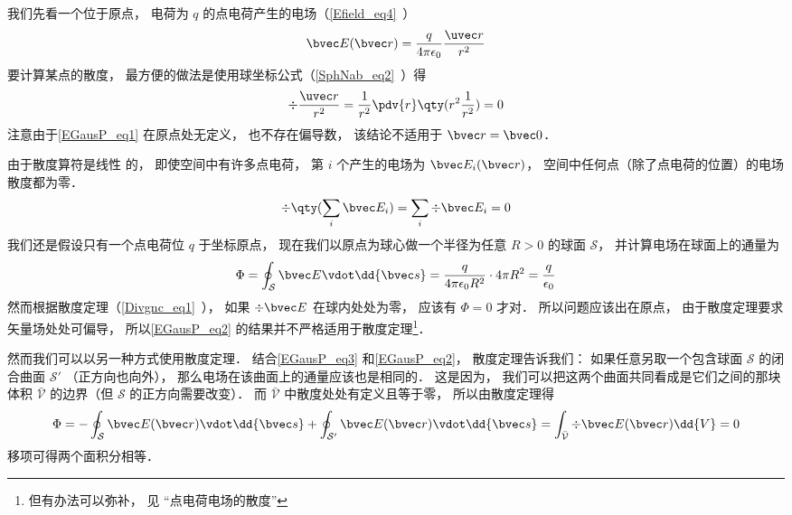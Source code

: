 




我们先看一个位于原点， 电荷为 $q$ 的点电荷产生的电场（\autoref{Efield_eq4}~）
\begin{equation}\label{EGausP_eq1}
\bvec E(\bvec r) = \frac{q}{4\pi\epsilon_0}\frac{\uvec r}{r^2}
\end{equation}
要计算某点的散度， 最方便的做法是使用球坐标公式（\autoref{SphNab_eq2}~）得
\begin{equation}
\div \frac{\uvec r}{r^2} = \frac{1}{r^2} \pdv{r} \qty(r^2 \frac{1}{r^2}) = 0
\end{equation}
注意由于\autoref{EGausP_eq1} 在原点处无定义， 也不存在偏导数， 该结论不适用于 $\bvec r = \bvec 0$．

由于散度算符是线性%
的， 即使空间中有许多点电荷， 第 $i$ 个产生的电场为 $\bvec E_i(\bvec r)$， 空间中任何点（除了点电荷的位置）的电场散度都为零．
\begin{equation}\label{EGausP_eq3}
\div \qty(\sum_i \bvec E_i) = \sum_i \div \bvec E_i = 0
\end{equation}
我们还是假设只有一个点电荷位 $q$ 于坐标原点， 现在我们以原点为球心做一个半径为任意 $R > 0$ 的球面 $\mathcal S$， 并计算电场在球面上的通量为
\begin{equation}\label{EGausP_eq2}
\Phi = \oint_{\mathcal S} \bvec E \vdot \dd{\bvec s} = \frac{q}{4\pi\epsilon_0 R^2} \cdot 4\pi R^2 = \frac{q}{\epsilon_0}
\end{equation}
然而根据散度定理（\autoref{Divgnc_eq1}~）， 如果 $\div \bvec E$ 在球内处处为零， 应该有 $\Phi = 0$ 才对． 所以问题应该出在原点， 由于散度定理要求矢量场处处可偏导， 所以\autoref{EGausP_eq2} 的结果并不严格适用于散度定理\footnote{但有办法可以弥补， 见 “点电荷电场的散度”}． %

然而我们可以以另一种方式使用散度定理． 结合\autoref{EGausP_eq3} 和\autoref{EGausP_eq2}， 散度定理告诉我们： 如果任意另取一个包含球面 $\mathcal S$ 的闭合曲面 $\mathcal S'$ （正方向也向外）， 那么电场在该曲面上的通量应该也是相同的． 这是因为， 我们可以把这两个曲面共同看成是它们之间的那块体积 $\bar{\mathcal V}$ 的边界（但 $\mathcal S$ 的正方向需要改变）． 而 $\bar{\mathcal V}$ 中散度处处有定义且等于零， 所以由散度定理得
\begin{equation}
\Phi = -\oint_{\mathcal S} \bvec E(\bvec r) \vdot \dd{\bvec s} + \oint_{\mathcal S'} \bvec E(\bvec r)\vdot \dd{\bvec s} = \int_{\bar{\mathcal V}} \div \bvec E(\bvec r) \dd{V} = 0
\end{equation}
移项可得两个面积分相等．

